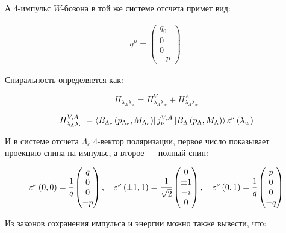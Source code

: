 А 4-импульс $W$-бозона в той же системе отсчета примет вид:
 
\begin{gather}
    q^\mu = 
    \begin{pmatrix}
        q_0 \\ 0 \\ 0 \\ -p
    \end{pmatrix}.
\end{gather}
 
Спиральность определяется как:
 
\begin{equation}
    H_{\lambda_\Lambda \lambda_w} = H^V_{\lambda_\Lambda \lambda_w} 
    + H^A_{\lambda_\Lambda \lambda_w} 
\end{equation}
 
\begin{equation}
    H^{V,A}_{\lambda_\Lambda \lambda_w} = 
    \bra{B_{\Lambda_c} \left( p_{\Lambda_c}, M_{\Lambda_c} \right)}
    j_\nu^{V,A}
    \ket{B_{\Lambda} \left( p_{\Lambda}, M_{\Lambda} \right)} 
    \varepsilon^\nu \left( \lambda_w \right)
    \label{eq:helisity}
\end{equation}
 
И в системе отсчета $\Lambda_c$ 4-вектор поляризации, первое число показывает 
проекцию спина на импульс, а второе --- полный спин:
 
\begin{gather}
    \varepsilon^\nu\left( 0, 0 \right) = \cfrac{1}{q} 
    \begin{pmatrix}
        q \\ 0 \\ 0 \\ -p
    \end{pmatrix},
    \quad
    \varepsilon^\nu\left( \pm 1, 1 \right) = \cfrac{1}{\sqrt{2}} 
    \begin{pmatrix}
        0 \\ \pm 1 \\ -i \\ 0
    \end{pmatrix},
    \quad
    \varepsilon^\nu\left( 0, 1 \right) = \cfrac{1}{q} 
    \begin{pmatrix}
        p \\ 0 \\ 0 \\ -q
    \end{pmatrix}
    \label{eq:pol}
\end{gather}
 
Из законов сохранения импульса и энергии можно также вывести, что:
 
